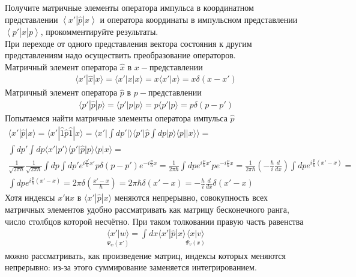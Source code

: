 \documentclass[__main__.tex]{subfiles}
\begin{document}
Получите матричные элементы оператора импульса в координатном представлении $\left<x'|\hat{p}|x\right>$ и оператора координаты в импульсном представлении $\left<p'|\hat{x}|p\right>$, прокомментируйте результаты.\\

При переходе от одного представления вектора состояния к другим представлениям надо осуществить преобразование операторов.\\
Матричный элемент оператора $\widehat{x}$ в $x-представлении$
\begin{gather*}
    \langle x'|\widehat{x}|x\rangle = \langle x'|x|x\rangle = x\langle x'|x\rangle = x\delta(x-x')
\end{gather*}
Матричный элемент оператора $\widehat{p}$ в $p-представлении$
\begin{gather*}
    \langle p'|\widehat{p}|p\rangle = \langle p'|p|p\rangle = p\langle p'|p\rangle = p\delta(p-p')
\end{gather*}
Попытаемся найти матричные элементы оператора импульса $\widehat{p}$
\begin{gather*}
    \langle x'|\widehat{p}|x\rangle = \langle x'|\widehat{1}\widehat{p}\widehat{1}|x\rangle =  \langle x'|\int{dp'|\rangle\langle p'|\widehat{p}\int{dp|p\rangle\langle p||x\rangle}}\rangle =\\ \int{dp'}\int{dp\langle x'|p'\rangle\langle p'|\widehat{p}|p\rangle\langle p|x\rangle} =\\ \frac{1}{\sqrt{2\pi\hbar}}\frac{1}{\sqrt{2\pi\hbar}}\int{dp}\int{dp'}e^{i\frac{p'}{\hbar}x'}p\delta(p - p')e^{-i\frac{p}{\hbar}x} = \frac{1}{2\pi\hbar}\int{dp}e^{i\frac{p}{\hbar}x'}pe^{-i\frac{p}{\hbar}x} = \frac{1}{2\pi\hbar}(-\frac{\hbar}{i}\frac{d}{dx})\int{dpe^{i\frac{p}{\hbar}(x' - x)}} =\\
    \int{dpe^{i\frac{p}{\hbar}(x' - x)}} = 2\pi\delta(\frac{x' - x}{\hbar}) = 2\pi\hbar\delta(x'-x) = -\frac{h}{i}\frac{d}{dx}\delta(x' - x)
\end{gather*}
Хотя индексы $x' и x$ в $\langle x'|\widehat{p}|x\rangle$ меняются непрерывно, совокупность всех матричных элементов удобно рассматривать как матрицу бесконечного ранга, число столбцов которой несчётно. При таком толковании правую часть равенства
\begin{gather*}
    \underset{\Psi_w(x')}{\langle x'|w\rangle} = \int{dx\langle x'|\widehat{p}|x\rangle\underset{\Psi_v(x)}{\langle x|v\rangle}}
\end{gather*}
можно рассматривать, как произведение матриц, индексы которых меняются непрерывно: из-за этого суммирование заменяется интегрированием.\\
\end{document}

